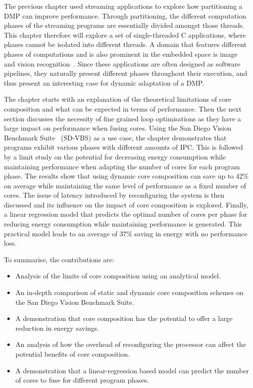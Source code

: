 The previous chapter used streaming applications to explore how partitioning a DMP can improve performance.
Through partitioning, the different computation phases of the streaming programs are essentially divided amongst those threads.
This chapter therefore will explore a set of single-threaded C applications, where phases cannot be isolated into different threads.
A domain that features different phases of computations and is also prominent in the embedded space is image and vision recognition~\cite{sd-vbs}.
Since these applications are often designed as software pipelines, they naturally present different phases throughout their execution, and thus present an interesting case for dynamic adaptation of a DMP.

The chapter starts with an explanation of the theoretical limitations of core composition and what can be expected in terms of performance.
Then the next section discusses the necessity of fine grained loop optimisations as they have a large impact on performance when fusing cores.
Using the San Diego Vision Benchmark Suite~\cite{sdvbs} (SD-VBS) as a use case, the chapter demonstrates that programs exhibit various phases with different amounts of IPC.
This is followed by a limit study on the potential for decreasing energy consumption while maintaining performance when adapting the number of cores for each program phase.
The results show that using dynamic core composition can save up to 42\% on average while maintaining the same level of performance as a fixed number of cores.
The issue of latency introduced by reconfiguring the system is then discussed and its influence on the impact of core composition is explored.
Finally, a linear regression model that predicts the optimal number of cores per phase for reducing energy consumption while maintaining performance is generated.
This practical model leads to an average of 37\% saving in energy with no performance loss.

To summarise, the contributions are:

\begin{itemize}
\item Analysis of the limits of core composition using an analytical model.
\vspace{-1em}
\item An in-depth comparison of static and dynamic core composition schemes on the San Diego Vision Benchmark Suite.
\vspace{-1em}
\item A demonstration that core composition has the potential to offer a large reduction in energy savings.
\vspace{-1em}
\item An analysis of how the overhead of reconfiguring the processor can affect the potential benefits of core composition.
\vspace{-1em}
\item A demonstration that a linear-regression based model can predict the number of cores to fuse for different program phases.
\end{itemize}
